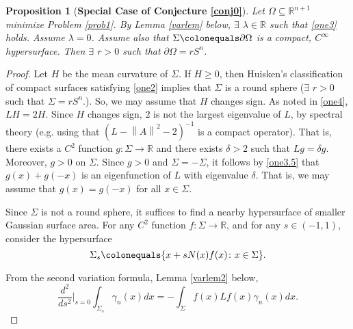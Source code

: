 \documentclass[12pt,reqno]{amsart}
\newtheorem{prop}[theorem]{Proposition}
\theoremstyle{definition}
\renewcommand{\subset}{\subseteq}
\newcommand{\vnormt}[1]{\left\|#1\right\|}    %
\newcommand{\R}{\mathbb{R}}
\newcommand{\embolden}[1]{\textbf {#1}}
\newcommand{\sdimn}{n}
\newcommand{\adimn}{n+1}
\newcommand{\scon}{\lambda}
\newcommand{\pcon}{\delta}
\begin{document}
\begin{prop}[\embolden{Special Case of Conjecture \ref{conj0}}]\label{prop2}
Let $\Omega\subset\R^{\adimn}$ minimize Problem \ref{prob1}.  By Lemma \ref{varlem} below, $\exists$ $\scon\in\R$ such that \eqref{one3} holds.  Assume $\scon=0$.  Assume also that $\Sigma\colonequals\partial\Omega$ is a compact, $C^{\infty}$ hypersurface.  Then $\exists$ $r>0$ such that $\partial\Omega=r S^{\sdimn}$.
\end{prop}
\begin{proof}
Let $H$ be the mean curvature of $\Sigma$.  If $H\geq0$, then Huisken's classification \cite{huisken90,huisken93} \cite[Theorem 0.17]{colding12a} of compact surfaces satisfying \eqref{one2} implies that $\Sigma$ is a round sphere ($\exists$ $r>0$ such that $\Sigma= r S^{\sdimn}$.).  So, we may assume that $H$ changes sign.  As noted in \eqref{one4}, $LH=2H$.  Since $H$ changes sign, $2$ is not the largest eigenvalue of $L$, by spectral theory \cite[Lemma 6.5]{zhu16} (e.g. using that $(L-\vnormt{A}^{2}-2)^{-1}$ is a compact operator).  That is, there exists a $C^{2}$ function $g\colon\Sigma\to\R$ and there exists $\pcon>2$ such that $Lg=\pcon g$.  Moreover, $g>0$ on $\Sigma$.  Since $g>0$ and $\Sigma=-\Sigma$, it follows by \eqref{one3.5} that $g(x)+g(-x)$ is an eigenfunction of $L$ with eigenvalue $\pcon$.  That is, we may assume that $g(x)=g(-x)$ for all $x\in\Sigma$.

Since $\Sigma$ is not a round sphere, it suffices to find a nearby hypersurface of smaller Gaussian surface area.  For any $C^{2}$ function $f\colon\Sigma\to\R$, and for any $s\in(-1,1)$, consider the hypersurface
\begin{equation}\label{one4.8}
\Sigma_{s}\colonequals\{x+sN(x)f(x)\colon x\in\Sigma\}.
\end{equation}

From the second variation formula, Lemma \ref{varlem2} below,
$$\frac{d^{2}}{d s^{2}}|_{s=0}\int_{\Sigma_{s}}\gamma_{\sdimn}(x)dx
=-\int_{\Sigma}f(x)Lf(x)\gamma_{\sdimn}(x)dx.$$


\end{proof}
\end{document}
